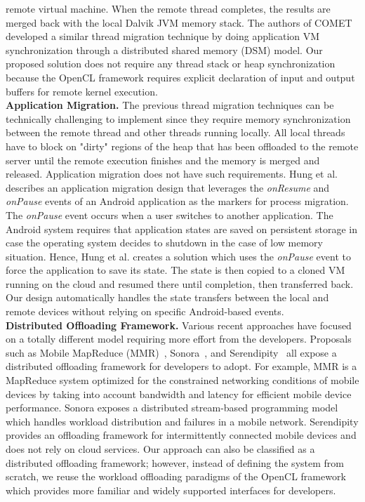 \documentclass[10pt, conference, compsocconf]{IEEEtran}
\begin{document}
remote virtual machine.
%
When the remote thread completes, the results are merged back with the
local Dalvik JVM memory stack.
%
The authors of COMET~\cite{comet} developed a similar thread migration
technique by doing application VM synchronization through a distributed
shared memory (DSM) model.
%
Our proposed solution does not require any thread stack or heap
synchronization because the OpenCL framework requires explicit
declaration of input and output buffers for remote kernel execution.\\
%
\indent\textbf{Application Migration.} The previous thread migration techniques
can be technically challenging to implement since they require memory
synchronization between the remote thread and other threads running
locally.
%
All local threads have to block on "dirty" regions of the heap that has
been offloaded to the remote server until the remote execution finishes
and the memory is merged and released.
%
Application migration does not have such requirements.
%
Hung et al.~\cite{hung} describes an application migration design that
leverages the \textit{onResume} and \textit{onPause} events of an
Android application as the markers for process migration.
%
The \textit{onPause} event occurs when a user switches to another
application.
%
The Android system requires that application states are saved on
persistent storage in case the operating system decides to shutdown in
the case of low memory situation.
%
Hence, Hung et al. creates a solution which uses the \textit{onPause}
event to force the application to save its state.
%
The state is then copied to a cloned VM running on the cloud and resumed
there until completion, then transferred back.
%
Our design automatically handles the state transfers between the local
and remote devices without relying on specific Android-based events.\\
%
\indent\textbf{Distributed Offloading Framework.} Various recent approaches
have focused on a totally different model requiring more effort from the
developers.
%
Proposals such as Mobile MapReduce (MMR)~\cite{mmr},
Sonora~\cite{sonora}, and Serendipity~\cite{serendipity} all expose a
distributed offloading framework for developers to adopt.
%
For example, MMR is a MapReduce system optimized for the constrained
networking conditions of mobile devices by taking into account bandwidth
and latency for efficient mobile device performance.
%
Sonora exposes a distributed stream-based programming model which
handles workload distribution and failures in a mobile network.
%
Serendipity provides an offloading framework for intermittently
connected mobile devices and does not rely on cloud services.
%
Our approach can also be classified as a distributed offloading
framework; however, instead of defining the system from scratch, we
reuse the workload offloading paradigms of the OpenCL
framework which provides more familiar and widely supported interfaces
for developers. 
%
\end{document}
